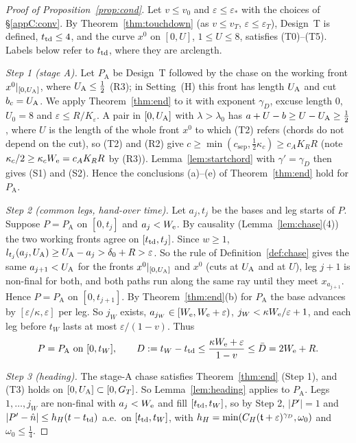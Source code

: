 \begin{proof}[Proof of Proposition~\ref{prop:cond}]
Let $v\le v_0$ and $\varepsilon\le\varepsilon_*$ with the choices of \S\ref{appC:conv}. By Theorem~\ref{thm:touchdown}
(as $v\le v_T$, $\varepsilon\le\varepsilon_T$), Design~T is defined, $t_{\mathrm{td}}\le4$, and the curve $x^0$ on $[0,U]$,
$1\le U\le8$, satisfies (T0)--(T5). Labels below refer to $t_{\mathrm{td}}$, where they are arclength.

\emph{Step 1 (stage A).} Let $P_{\mathrm A}$ be Design~T followed by the chase on the working front $x^0|_{[0,U_{\mathrm{A}}]}$,
where $U_{\mathrm{A}}\le\frac12$ (R3); in Setting~(H) this front has length $U_{\mathrm{A}}$ and cut $b_c=U_{\mathrm{A}}$. We apply
Theorem~\ref{thm:end} to it with exponent $\gamma_D$, excuse length $0$, $U_0=8$ and $\varepsilon\le R/K_\varepsilon$. A
pair in $[0,U_{\mathrm{A}}]$ with $\lambda>\lambda_0$ has $a+U-b\ge U-U_{\mathrm{A}}\ge\frac12$, where $U$ is the length of the whole front
$x^0$ to which (T2) refers (chords do not depend on the cut), so (T2) and (R2) give $c\ge\min(c_{\mathrm{sep}},\frac12\kappa_c)\ge c_AK_RR$ (note
$\kappa_c/2\ge\kappa_cW_{\mathrm{e}}=c_AK_RR$ by (R3)). Lemma~\ref{lem:startchord} with $\gamma'=\gamma_D$ then gives (S1) and
(S2). Hence the conclusions (a)--(e) of Theorem~\ref{thm:end} hold for $P_{\mathrm A}$.

\emph{Step 2 (common legs, hand-over time).} Let $a_j,t_j$ be the bases and leg starts of $P$. Suppose $P=P_{\mathrm A}$ on
$[0,t_j]$ and $a_j<W_{\mathrm{e}}$. By causality (Lemma~\ref{lem:chase}(4)) the two working fronts agree on $[t_{\mathrm{td}},t_j]$. Since
$w\ge1$, $l_{t_j}(a_j,U_{\mathrm{A}})\ge U_{\mathrm{A}}-a_j>\delta_0+R>\varepsilon$. So the rule of Definition~\ref{def:chase} gives the same
$a_{j+1}<U_{\mathrm{A}}$ for the fronts $x^0|_{[0,U_{\mathrm{A}}]}$ and $x^0$ (cuts at $U_{\mathrm{A}}$ and at $U$), leg $j+1$ is non-final for both, and both paths run along the same ray
until they meet $x_{a_{j+1}}$. Hence $P=P_{\mathrm A}$ on $[0,t_{j+1}]$. By Theorem~\ref{thm:end}(b) for $P_{\mathrm A}$
the base advances by $[\varepsilon/\kappa,\varepsilon]$ per leg. So $j_W$ exists, $a_{j_W}\in[W_{\mathrm{e}},W_{\mathrm{e}}+\varepsilon)$,
$j_W<\kappa W_{\mathrm{e}}/\varepsilon+1$, and each leg before $t_W$ lasts at most $\varepsilon/(1-v)$. Thus
\[
P=P_{\mathrm A}\ \text{on }[0,t_W],\qquad D:=t_W-t_{\mathrm{td}}\le\frac{\kappa W_{\mathrm{e}}+\varepsilon}{1-v}\le\bar D=2W_{\mathrm{e}}+R .
\]

\emph{Step 3 (heading).} The stage-A chase satisfies Theorem~\ref{thm:end} (Step 1), and (T3) holds on $[0,U_{\mathrm{A}}]\subset[0,G_T]$.
So Lemma~\ref{lem:heading} applies to $P_{\mathrm A}$. Legs $1,\dots,j_W$ are non-final with $a_j<W_{\mathrm{e}}$ and fill
$[t_{\mathrm{td}},t_W]$, so by Step 2, $|P'|=1$ and $|P'-\hat n|\le h_H(t-t_{\mathrm{td}})$ a.e.\ on $[t_{\mathrm{td}},t_W]$, with
$h_H=\min(C_H(\mathfrak{t}+\varepsilon)^{\gamma_D},\omega_0)$ and $\omega_0\le\frac14$.


\end{proof}
